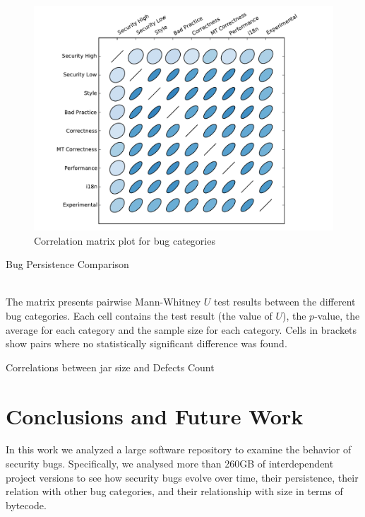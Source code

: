 \documentclass{sig-alternate}
\begin{document}
\begin{figure}[t]
  \centering
  \includegraphics[scale=0.47]{corrplot.pdf}
  \caption{Correlation matrix plot for bug categories}
  \label{fig:corrplot}
\end{figure}

\begin{landscape}
  \begin{table}
    \setlength{\extrarowheight}{0.10cm}
    \caption{Bug Persistence Comparison}
    \label{tbl:bug_persistence}
    \resizebox{0.95\columnwidth}{!}{
    }\\
    The matrix presents pairwise Mann-Whitney $U$ test results
    between the different bug categories. Each cell contains the test
    result (the value of $U$), the $p$-value, the average for each
    category and the sample size for each category. Cells in brackets show
    pairs where no statistically significant difference was found.
  \end{table}
\end{landscape}

\begin{table}[t]
    \centering
    \caption{Correlations between {\sc jar} size and Defects Count}
    \label{tbl:jarsizecorr}
    
\end{table}

\section{Conclusions and Future Work}
\label{sec:con}

In this work we analyzed a large software repository to examine the
behavior of security bugs. Specifically, we analysed more than 260GB
of interdependent project versions to see how security bugs evolve
over time, their persistence, their relation with other bug
categories, and their relationship with size in terms of bytecode.
\end{document}
